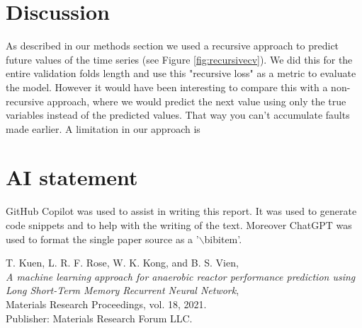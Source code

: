 \documentclass[conference]{IEEEtran}
\begin{document}
\section{Discussion}
As described in our methods section we used a recursive approach to predict future values of the time series (see Figure \ref{fig:recursivecv}).
We did this for the entire validation folds length and use this "recursive loss" as a metric to evaluate the model. 
However it would have been interesting to compare this with a non-recursive approach, where we would predict the next 
value using only the true variables instead of the predicted values. That way you can't accumulate faults
made earlier.  
A limitation in our approach is 

\section*{AI statement}
GitHub Copilot was used to assist in writing this report. It was used to generate code snippets and
to help with the writing of the text. Moreover ChatGPT was used to format the single paper source as a 
'$\backslash$bibitem'.


\begin{thebibliography}{9}

    T. Kuen, L. R. F. Rose, W. K. Kong, and B. S. Vien,\\
    \textit{A machine learning approach for anaerobic reactor performance prediction using Long Short-Term Memory Recurrent Neural Network},\\
    Materials Research Proceedings, vol. 18, 2021.\\
    Publisher: Materials Research Forum LLC.
    
    \end{thebibliography}
    
\end{document}
